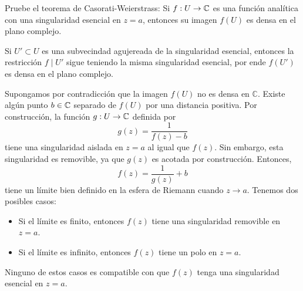 \begin{exercise}
Pruebe el teorema de Casorati-Weierstrass: Si $f : U \to \mathbb C$ es una función analítica con una singularidad esencial en $z = a$, entonces su imagen $f(U)$ es densa en el plano complejo.
\end{exercise}

\begin{remark}
Si $U' \subset U$ es una subvecindad agujereada de la singularidad esencial, entonces la restricción $f \mid U'$ sigue teniendo la misma singularidad esencial, por ende $f(U')$ es densa en el plano complejo.
\end{remark}

\begin{solution}
Supongamos por contradicción que la imagen $f(U)$ no es densa en $\mathbb C$. Existe algún punto $b \in \mathbb C$ separado de $f(U)$ por una distancia positiva. Por construcción, la función $g : U \to \mathbb C$ definida por
$$g(z) = \frac 1 {f(z) - b}$$
tiene una singularidad aislada en $z = a$ al igual que $f(z)$. Sin embargo, esta singularidad es removible, ya que $g(z)$ es acotada por construcción. Entonces,
$$f(z) = \frac 1 {g(z)} + b$$
tiene un límite bien definido en la esfera de Riemann cuando $z \to a$. Tenemos dos posibles casos:
\begin{itemize}
    \item Si el límite es finito, entonces $f(z)$ tiene una singularidad removible en $z = a$.
    \item Si el límite es infinito, entonces $f(z)$ tiene un polo en $z = a$.
\end{itemize}
Ninguno de estos casos es compatible con que $f(z)$ tenga una singularidad esencial en $z = a$.
\end{solution}
